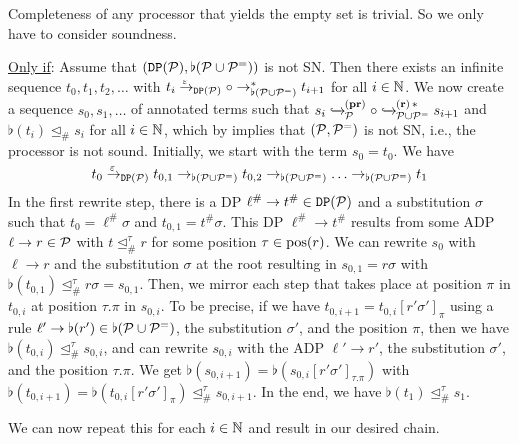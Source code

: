 \begin{myproof}
Completeness of any processor that yields the empty set is trivial. So we only have to
consider soundness.
  
    \underline{Only if}:
    Assume that $(\mathtt{DP}(\mathcal{P}),\flat(\mathcal{P} \cup \mathcal{P}^{=}))$ is not SN.
    Then
there exists an infinite sequence $t_0, t_1, t_2, \ldots$ 
    with $t_i \rootto_{\DP{\C{P}}} \circ \to_{\flat(\C{P} \cup \C{P}^{=})}^* t_{i+1}$ for all $i \in \mathbb{N}$.
    We now create a sequence $s_0, s_1, \ldots$ of annotated terms such that 
    $s_i \mathrel{ \xhookrightarrow{{}_{\scriptstyle }} \!\!{}^{(\mathbf{pr})}_{\mathcal{P}} } \circ \mathrel{ \xhookrightarrow{{}_{\scriptstyle }} \!\!{}^{(\mathbf{r}) \, *}_{\mathcal{P} \cup
      \mathcal{P}^{=}} } s_{i+1}$
and $\flat(t_i) \trianglelefteq_{\#} s_i$    
    for all $i \in \mathbb{N}$, which  by  implies that $(\mathcal{P},\mathcal{P}^{=})$ is not SN, i.e., the
    processor is not sound.
    Initially, we start with the term $s_0 = t_0$.
    We have 
    \[
        t_0 \rootto_{\DP{\C{P}}} t_{0,1} \to_{\flat(\C{P} \cup \C{P}^{=})} t_{0,2} \to_{\flat(\C{P} \cup \C{P}^{=})} \ldots \to_{\flat(\C{P} \cup \C{P}^{=})} t_{1}
    \]
    In the first rewrite step, there is a DP $\ell^\# \to t^\# \in \mathtt{DP}(\mathcal{P})$ and a substitution $\sigma$
    such that $t_0 = \ell^\# \sigma$ and $t_{0,1} = t^\# \sigma$.
    This DP $\ell^\# \to t^\#$ results from some ADP $\ell \to r \in \mathcal{P}$ with
    $t \trianglelefteq_{\#}^{\tau} r$
    for some position $\tau \in \mathrm{pos}(r)$.
    We can rewrite $s_0$ with $\ell \to r$ and the substitution $\sigma$ at the root
    resulting in $s_{0,1} = r\sigma$ with
    $\flat(t_{0,1}) \trianglelefteq_{\#}^{\tau}
    r\sigma = s_{0,1}$. 
    Then, we mirror each step that takes place at position $\pi$ in $t_{0,i}$ at position $\tau.\pi$ in $s_{0,i}$.
    To be precise, if we have $t_{0,i+1} = t_{0,i}[r' \sigma']_{\pi}$ using a rule $\ell' \to \flat(r') \in \flat(\mathcal{P} \cup \mathcal{P}^{=})$, the substitution $\sigma'$, and the position $\pi$, then we have $\flat(t_{0,i}) \trianglelefteq_{\#}^{\tau} s_{0,i}$, and can rewrite $s_{0,i}$
    with the ADP $\ell' \to r'$, the substitution $\sigma'$, and the position $\tau.\pi$.
    We get $\flat(s_{0,i+1}) = \flat(s_{0,i}[r' \sigma']_{\tau.\pi})$
    with $\flat(t_{0,i+1}) = \flat(t_{0,i}[r' \sigma']_{\pi}) \trianglelefteq_{\#}^{\tau}  s_{0,i+1}$.
    In the end, we have $\flat(t_1) \trianglelefteq_{\#}^{\tau} s_1$.

    We can now repeat this for each $i \in \mathbb{N}$ and result in our desired chain.
    
    \smallskip


\end{myproof}
